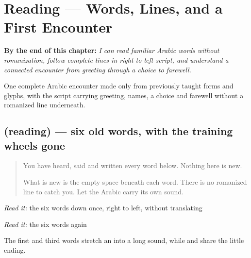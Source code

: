 
\chapter{Reading — Words, Lines, and a First Encounter}
\label{ch:ar-first-reading}

\begin{chapteropening}
\textbf{By the end of this chapter:} \emph{I can read familiar Arabic words without romanization, follow complete lines in right-to-left script, and understand a connected encounter from greeting through a choice to farewell.}

One complete Arabic encounter made only from previously taught forms and glyphs, with the script carrying greeting, names, a choice and farewell without a romanized line underneath.
\end{chapteropening}

\section[(reading)]{(reading) — six old words, with the training wheels gone}

\label{lesson:AR-C42-words}



\begin{quote}
You have heard, said and written every word below. Nothing here is new.

What is new is the empty space beneath each word. There is no romanized line to catch you. Let the Arabic carry its own sound.
\end{quote}

\begin{tcolorbox}[breakable,skin=enhanced,colback=orange!6,colframe=orange!45!black,boxrule=0.5pt,arc=1mm,left=6pt,right=6pt,top=4pt,bottom=4pt,fonttitle=\bfseries,title={Read this}]
\begin{quote}
     
\end{quote}

\emph{Read it:} the six words down once, right to left, without translating

\emph{Read it:} the six words again

The first and third words stretch an \textbf{} into a long sound, while \textbf{} and \textbf{} share the little \textbf{} ending.
\end{tcolorbox}

